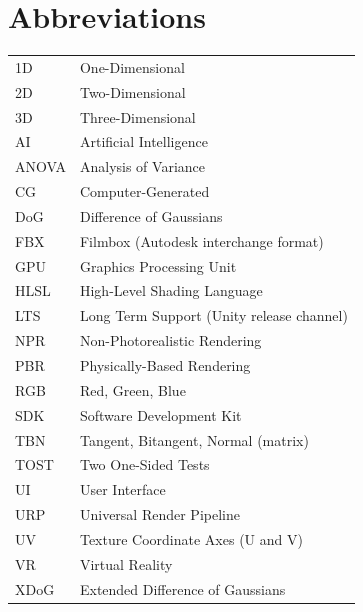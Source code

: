 \chapter*{Abbreviations}

\begin{tabular}{@{}lp{}@{}}
  1D     & One-Dimensional \\[0.3em]
  2D     & Two-Dimensional \\[0.3em]
  3D     & Three-Dimensional \\[0.3em]
  AI     & Artificial Intelligence \\[0.3em]
  ANOVA  & Analysis of Variance \\[0.3em]
  CG     & Computer-Generated \\[0.3em]
  DoG    & Difference of Gaussians \\[0.3em]
  FBX    & Filmbox (Autodesk interchange format) \\[0.3em]
  GPU    & Graphics Processing Unit \\[0.3em]
  HLSL   & High-Level Shading Language \\[0.3em]
  LTS    & Long Term Support (Unity release channel) \\[0.3em]
  NPR    & Non-Photorealistic Rendering \\[0.3em]
  PBR    & Physically-Based Rendering \\[0.3em]
  RGB    & Red, Green, Blue \\[0.3em]
  SDK    & Software Development Kit \\[0.3em]
  TBN    & Tangent, Bitangent, Normal (matrix) \\[0.3em]
  TOST   & Two One-Sided Tests \\[0.3em]
  UI     & User Interface \\[0.3em]
  URP    & Universal Render Pipeline \\[0.3em]
  UV     & Texture Coordinate Axes (U and V) \\[0.3em]
  VR     & Virtual Reality \\[0.3em]
  XDoG   & Extended Difference of Gaussians \\
\end{tabular}
